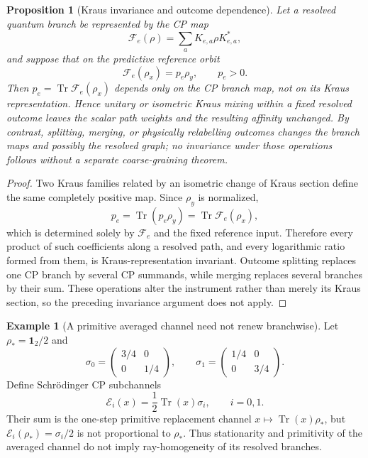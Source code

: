 \documentclass[11pt]{article}
\newtheorem{proposition}[theorem]{Proposition}
\theoremstyle{definition}
\newtheorem{example}[theorem]{Example}
\theoremstyle{remark}
\newcommand{\one}{\mathbf 1}
\newcommand{\Tr}{\operatorname{Tr}}
\begin{document}
\begin{proposition}[Kraus invariance and outcome dependence]
\label{prop:kraus-invariance}
Let a resolved quantum branch be represented by the CP map
\[
 \mathcal F_e(\rho)=\sum_aK_{e,a}\rho K_{e,a}^*,
\]
and suppose that on the predictive reference orbit
\[
 \mathcal F_e(\rho_x)=p_e\rho_y,
 \qquad p_e>0.
\]
Then $p_e=\Tr\mathcal F_e(\rho_x)$ depends only on the CP branch map, not on its
Kraus representation.  Hence unitary or isometric Kraus mixing within a fixed
resolved outcome leaves the scalar path weights and the resulting affinity
unchanged.  By contrast, splitting, merging, or physically relabelling outcomes
changes the branch maps and possibly the resolved graph; no invariance under
those operations follows without a separate coarse-graining theorem.
\end{proposition}

\begin{proof}
Two Kraus families related by an isometric change of Kraus section define the
same completely positive map.  Since $\rho_y$ is normalized,
\[
 p_e=\Tr(p_e\rho_y)=\Tr\mathcal F_e(\rho_x),
\]
which is determined solely by $\mathcal F_e$ and the fixed reference input.
Therefore every product of such coefficients along a resolved path, and every
logarithmic ratio formed from them, is Kraus-representation invariant.  Outcome
splitting replaces one CP branch by several CP summands, while merging replaces
several branches by their sum.  These operations alter the instrument rather
than merely its Kraus section, so the preceding invariance argument does not
apply.
\end{proof}

\begin{example}[A primitive averaged channel need not renew branchwise]
\label{ex:average-not-branchwise}
Let $\rho_*=\one_2/2$ and
\[
 \sigma_0=\begin{pmatrix}3/4&0\\0&1/4\end{pmatrix},
 \qquad
 \sigma_1=\begin{pmatrix}1/4&0\\0&3/4\end{pmatrix}.
\]
Define Schr\"odinger CP subchannels
\[
 \mathcal E_i(x)=\frac12\Tr(x)\sigma_i,
 \qquad i=0,1.
\]
Their sum is the one-step primitive replacement channel
$x\mapsto\Tr(x)\rho_*$, but
$\mathcal E_i(\rho_*)=\sigma_i/2$ is not proportional to $\rho_*$.  Thus
stationarity and primitivity of the averaged channel do not imply
ray-homogeneity of its resolved branches.
\end{example}
\end{document}
